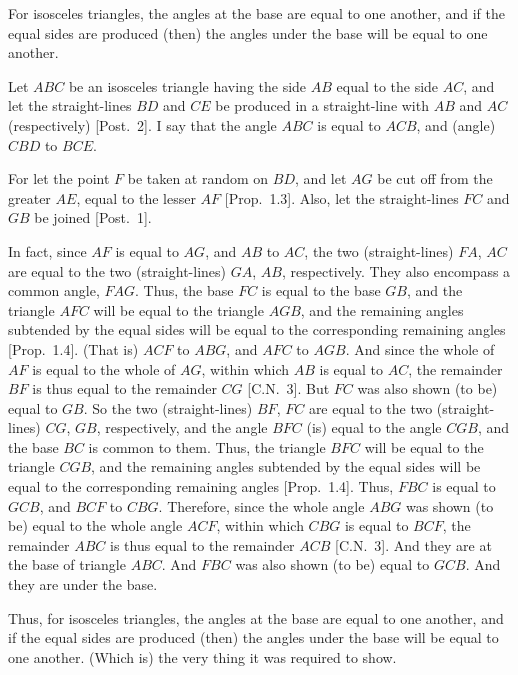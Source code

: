 \begin{Parallel}{}{}
{For isosceles triangles, the angles at the base are equal to one another, and if
the equal sides are produced (then) the angles under the base will be equal to one another.

Let $ABC$ be an isosceles triangle having the side $AB$ equal to the side $AC$, and let the straight-lines $BD$ and $CE$ be produced in a straight-line
with $AB$ and $AC$ (respectively) [Post.~2]. I say that the angle $ABC$ is equal to $ACB$, and (angle) $CBD$  to $BCE$.

For let the point $F$ be taken at random on  $BD$, and let $AG$
be cut off from the greater $AE$, equal to the lesser $AF$ [Prop.~1.3]. Also, let
the straight-lines $FC$ and $GB$ be joined [Post.~1].

\epsfysize=1.85in
\centerline{}

In fact, since $AF$ is equal to $AG$, and $AB$ to $AC$, the two (straight-lines) $FA$, $AC$ are
equal to the two (straight-lines) $GA$, $AB$, respectively. They also encompass a
common angle, $FAG$. Thus, the base $FC$ is equal to the base $GB$, and the
triangle $AFC$ will be equal to the triangle $AGB$, and the remaining angles
subtended by the equal sides will
be equal to the corresponding  remaining angles [Prop.~1.4].  (That is) $ACF$ to $ABG$, and $AFC$ to $AGB$. And since the whole of $AF$ is
equal to the whole of $AG$, within which $AB$ is equal to $AC$, the remainder
$BF$ is thus equal to the remainder $CG$ [C.N.~3]. But $FC$ was also shown (to be) equal to $GB$. So
the two (straight-lines) $BF$, $FC$ are equal to the two (straight-lines) $CG$, $GB$, respectively,
and the angle $BFC$ (is) equal to the angle $CGB$, and the base $BC$ is common to
them. Thus, the triangle $BFC$ will be equal to the triangle $CGB$, and
the remaining angles subtended by the equal sides will be equal to the corresponding remaining angles [Prop.~1.4]. Thus, $FBC$ is equal to $GCB$, and $BCF$ to
$CBG$. Therefore, since the whole angle $ABG$ was shown (to be) equal to the
whole angle $ACF$, within which $CBG$ is equal to $BCF$, the remainder $ABC$
is thus equal to the remainder $ACB$ [C.N.~3]. And they are at the base of triangle
$ABC$. And $FBC$ was also shown (to be) equal to $GCB$. And they are under
the base.

Thus, for isosceles triangles, the angles at the base are equal to one another, and if
the equal sides are produced (then) the angles under the base will be equal to one another. (Which is) the very thing it was required to show.}
\end{Parallel}


